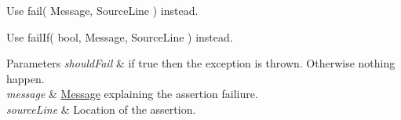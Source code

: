 
\begin{DoxyRefList}
\item[\label{deprecated__deprecated000001}%
\hypertarget{deprecated__deprecated000001}{}%
Member \hyperlink{postprocess_8h_acd2361a766665ce2dbfb3eae201b784d}{ai\-Process\-\_\-\-Convert\-To\-Left\-Handed} ]
\item[\label{deprecated__deprecated000002}%
\hypertarget{deprecated__deprecated000002}{}%
Member \hyperlink{struct_asserter_a74825fc71909baa1286f9282ba5a2a54}{Asserter\-:\-:fail} (std\-::string message, const \hyperlink{class_source_line}{Source\-Line} \&source\-Line=\hyperlink{class_source_line}{Source\-Line()})]Use fail( Message, Source\-Line ) instead.  
\item[\label{deprecated__deprecated000003}%
\hypertarget{deprecated__deprecated000003}{}%
Member \hyperlink{struct_asserter_a71a4667a9d3f5d483f1a82157f715824}{Asserter\-:\-:fail\-If} (bool should\-Fail, std\-::string message, const \hyperlink{class_source_line}{Source\-Line} \&source\-Line=\hyperlink{class_source_line}{Source\-Line()})]Use fail\-If( bool, Message, Source\-Line ) instead. 
\begin{DoxyParams}{Parameters}
{\em should\-Fail} & if {\ttfamily true} then the exception is thrown. Otherwise nothing happen. \\
\hline
{\em message} & \hyperlink{class_message}{Message} explaining the assertion failiure. \\
\hline
{\em source\-Line} & Location of the assertion.  \\
\hline
\end{DoxyParams}


\end{DoxyRefList}
